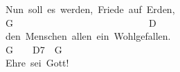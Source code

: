 \documentclass[]{book}
\begin{document}
Nun~soll~es~werden,~Friede~auf~Erden,\\
G~~~~~~~~~~~~~~~~~~~~~~~~~~~~D\\
den~Menschen~allen~ein~Wohlgefallen.\\
G~~~~D7~~G\\
Ehre~sei~Gott!\\
~\\
\end{document}
